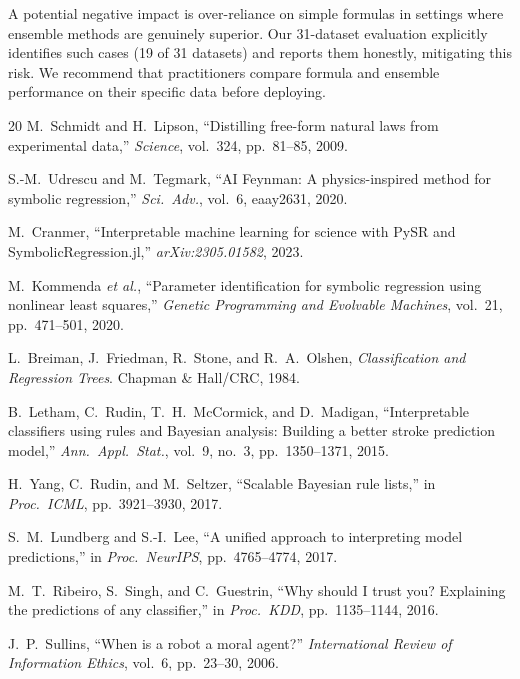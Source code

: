 \documentclass[journal]{IEEEtran}
\begin{document}
A potential negative impact is over-reliance on simple formulas in
settings where ensemble methods are genuinely superior.  Our
31-dataset evaluation explicitly identifies such cases (19 of 31
datasets) and reports them honestly, mitigating this risk.  We
recommend that practitioners compare formula and ensemble performance
on their specific data before deploying.

\begin{thebibliography}{20}
M.~Schmidt and H.~Lipson, ``Distilling free-form natural laws from
experimental data,'' \emph{Science}, vol.~324, pp.~81--85, 2009.

S.-M.~Udrescu and M.~Tegmark, ``AI Feynman: A physics-inspired
method for symbolic regression,'' \emph{Sci.\ Adv.}, vol.~6,
eaay2631, 2020.

M.~Cranmer, ``Interpretable machine learning for science with PySR
and SymbolicRegression.jl,'' \emph{arXiv:2305.01582}, 2023.

M.~Kommenda \emph{et al.}, ``Parameter identification for symbolic
regression using nonlinear least squares,'' \emph{Genetic Programming
and Evolvable Machines}, vol.~21, pp.~471--501, 2020.

L.~Breiman, J.~Friedman, R.~Stone, and R.~A.~Olshen,
\emph{Classification and Regression Trees}.
Chapman \& Hall/CRC, 1984.

B.~Letham, C.~Rudin, T.~H.~McCormick, and D.~Madigan,
``Interpretable classifiers using rules and Bayesian analysis:
Building a better stroke prediction model,''
\emph{Ann.\ Appl.\ Stat.}, vol.~9, no.~3, pp.~1350--1371, 2015.

H.~Yang, C.~Rudin, and M.~Seltzer, ``Scalable Bayesian rule lists,''
in \emph{Proc.\ ICML}, pp.~3921--3930, 2017.

S.~M.~Lundberg and S.-I.~Lee, ``A unified approach to interpreting
model predictions,'' in \emph{Proc.\ NeurIPS}, pp.~4765--4774, 2017.

M.~T.~Ribeiro, S.~Singh, and C.~Guestrin, ``Why should I trust you?
Explaining the predictions of any classifier,'' in \emph{Proc.\ KDD},
pp.~1135--1144, 2016.

J.~P.~Sullins, ``When is a robot a moral agent?''
\emph{International Review of Information Ethics}, vol.~6,
pp.~23--30, 2006.


\end{thebibliography}
\end{document}
